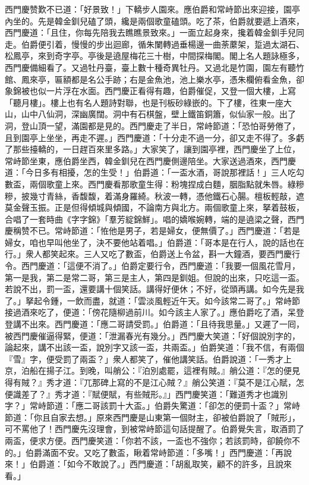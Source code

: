 西門慶赞歎不已道：「好景致！」下轎步人園來。應伯爵和常峙節出來迎接，園亭內坐的。先是韓金釧兒磕了頭，纔是兩個歌童磕頭。吃了茶，伯爵就要遞上酒來，西門慶道：「且住，你每先陪我去瞧瞧景致來。」一面立起身來，攙着韓金釧手兒同走。伯爵便引着，慢慢的步出迴廊，循朱闌轉過垂楊邊一曲荼䕷架，踅過太湖石、松鳳亭，來到奇字亭。亭後是遶屋梅花三十樹，中間探梅閣。閣上名人題詠極多，西門慶備細看了。又過牡丹臺，臺上數十種奇異牡丹。又過北是竹園，園左有聽竹館、鳳來亭，匾額都是名公手跡；右是金魚池，池上樂水亭，憑朱欄俯看金魚，卻象錦被也似一片浮在水面。西門慶正看得有趣，伯爵催促，{}又登一個大樓，上寫「聽月樓」。樓上也有名人題詩對聯，也是刊板砂綠嵌的。下了樓，徃東一座大山，山中八仙洞，深幽廣闊。洞中有石棋盤，壁上鐵笛銅簫，似仙家一般。出了洞，登山頂一望，滿園都是見的。{}西門慶走了半日，常峙節道：「恐怕哥勞倦了，且到園亭上坐坐，再走不遲。」西門慶道：「十分走不過一分，卻又走不得了。多虧了那些擡轎的，一日趕百來里多路。」{}大家笑了，讓到園亭裡，西門慶坐了上位，常峙節坐東，應伯爵坐西，韓金釧兒在西門慶側邊陪坐。大家送過酒來，西門慶道：「今日多有相擾，怎的生受！」伯爵道：「一盃水酒，哥說那裡話！」三人吃勾數盃，兩個歌童上來。西門慶看那歌童生得：粉塊捏成白麵，胭脂點就朱唇。綠糝糝，披幾寸青絲，{}香馥馥，着滿身羅綺。秋波一轉，憑他鐵石心腸。檀板輕敲，遮莫金聲玉振。正是但得傾城與傾國，不論南方與北方。兩個歌童上來，拏着鼓板，合唱了一套時曲《字字錦》「羣芳綻錦鮮」。唱的嬌喉婉轉，端的是遶梁之聲，西門慶稱赞不已。常峙節道：「恠他是男子，若是婦女，便無價了。」西門慶道：「若是婦女，咱也早叫他坐了，決不要他站着唱。」{}伯爵道：「哥本是在行人，說的話也在行。」衆人都笑起來。三人又吃了數盃，伯爵送上令盆，斟一大鐘酒，要西門慶行令。西門慶道：「這便不消了。」伯爵定要行令，西門慶道：「我要一個風花雪月，第一是我，第二是常二哥，第三是主人，第四是釧姐。但說的出來，只吃這一盃。若說不出，罰一盃，還要講十個笑話。講得好便休；不好，從頭再講。如今先是我了。」拏起令鍾，一飲而盡，就道：「雲淡風輕近午天。{}如今該常二哥了。」常峙節接過酒來吃了，便道：「傍花隨柳過前川。{}如今該主人家了。」應伯爵吃了酒，呆登登講不出來。西門慶道：「應二哥請受罰。」伯爵道：「且待我思量。」又遲了一囘，被西門慶催逼得緊，便道：「泄漏春光有幾分。」西門慶大笑道：「好個說別字的，論起來，講不出該一盃，說別字又該一盃，共兩盃。」伯爵笑道：「我不信，有兩個『雪』字，便受罰了兩盃？」衆人都笑了，催他講笑話。伯爵說道：「一秀才上京，泊船在揚子江。到晚，叫艄公：『泊別處罷，這裡有賊。』艄公道：『怎的便見得有賊？』秀才道：『兀那碑上寫的不是江心賊？』艄公笑道：『莫不是江心賦，怎便識差了？』秀才道：『賦便賦，有些賊形。』」西門慶笑道：「難道秀才也識別字？」{}常峙節道：「應二哥該罰十大盃。」伯爵失驚道：「卻怎的便罰十盃？」常峙節道：「你且自家去想。」原來西門慶是山東第一個財主，卻被伯爵說了「賊形」，可不罵他了！西門慶先沒理會，到被常峙節這句話提醒了。伯爵覺失言，取酒罰了兩盃，便求方便。西門慶笑道：「你若不該，一盃也不強你；若該罰時，卻饒你不的。」伯爵滿面不安。又吃了數盃，瞅着常峙節道：「多嘴！」{}{}西門慶道：「再說來！」伯爵道：「如今不敢說了。」西門慶道：「胡亂取笑，顧不的許多，且說來看。」

